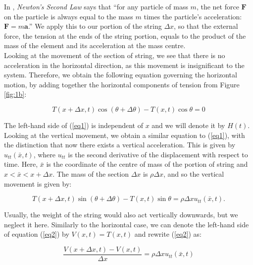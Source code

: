 \documentclass[a4paper, 12pt]{article}
\numberwithin{equation}{section}
\begin{document}
In \cite{Tay}, \emph{Newton's Second Law} says that ``for any particle of mass $m$, the net force 
$\boldsymbol{F}$ on the particle is always equal to the mass $m$ times the particle's 
acceleration: $\boldsymbol{F} = m \boldsymbol{a}$.''  We apply this to our 
portion of the string $\Delta x$, so that the external
force, the tension at the ends of the string portion, equals to the product of the mass of the element and 
its acceleration at the mass centre. 
\\

Looking at the movement of the section of string, we see that there is no acceleration in the horizontal direction,  
as this movement is insignificant to the system. Therefore, we obtain the 
following equation governing the horizontal motion, by adding together the horizontal components of tension from Figure \ref{fig:1b}:

\begin {equation} \label{eq1}
    T(x+\Delta x,t)\cos{(\theta + \Delta \theta)}-T(x,t)\cos{\theta}=0
\end {equation}

The left-hand side of (\ref{eq1}) is independent of $x$ and we will denote it by $H(t)$.
\\

Looking at the vertical movement, we obtain a similar equation to (\ref{eq1}), with the distinction
that now there exists a vertical acceleration. This is given by $u_{tt} (\bar{x},t)$, where $u_{tt}$ is the second derivative
of the displacement with respect to time. Here,
 $\bar{x}$ is the coordinate of the centre of mass of the portion of string and $x<\bar{x}<x+\Delta x$. The mass of the 
 section $\Delta x$ is $\rho\Delta x$, and so the vertical movement is given by:

 \begin{equation} \label{eq2}
    T(x+\Delta x,t)\sin{(\theta + \Delta \theta)}-T(x,t)\sin{\theta}=\rho\Delta x u_{tt} (\bar{x},t).
 \end{equation}

 Usually, the weight of the string would also act vertically downwards, but we neglect it here. Similarly to the 
 horizontal case, we can denote the left-hand side of equation (\ref{eq2}) by $V(x,t)=T(x,t)$ and rewrite (\ref{eq2})
 as:

 \begin{equation} \label{eq3}
    \frac{V(x+\Delta x,t)-V(x,t)}{\Delta x}=\rho\Delta x u_{tt} (\bar{x},t)
 \end{equation}
\end{document}
